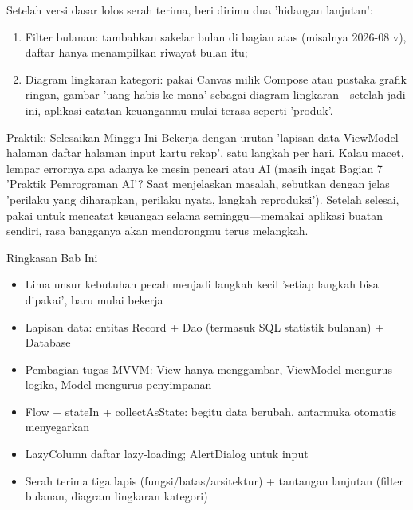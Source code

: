 Setelah versi dasar lolos serah terima, beri dirimu dua 'hidangan lanjutan':

\begin{enumerate}
  \item Filter bulanan: tambahkan sakelar bulan di bagian atas (misalnya 2026-08 v), daftar hanya menampilkan riwayat bulan itu;
  \item Diagram lingkaran kategori: pakai Canvas milik Compose atau pustaka grafik ringan, gambar 'uang habis ke mana' sebagai diagram lingkaran—setelah jadi ini, aplikasi catatan keuanganmu mulai terasa seperti 'produk'.
\end{enumerate}

\begin{tcbpractice}{Praktik: Selesaikan Minggu Ini}
Bekerja dengan urutan 'lapisan data ViewModel halaman daftar halaman input kartu rekap', satu langkah per hari. Kalau macet, lempar errornya apa adanya ke mesin pencari atau AI (masih ingat Bagian 7 'Praktik Pemrograman AI'? Saat menjelaskan masalah, sebutkan dengan jelas 'perilaku yang diharapkan, perilaku nyata, langkah reproduksi'). Setelah selesai, pakai untuk mencatat keuangan selama seminggu—memakai aplikasi buatan sendiri, rasa bangganya akan mendorongmu terus melangkah.

\end{tcbpractice}

\begin{tcbsummary}{Ringkasan Bab Ini}
\begin{itemize}
  \item Lima unsur kebutuhan pecah menjadi langkah kecil 'setiap langkah bisa dipakai', baru mulai bekerja
  \item Lapisan data: entitas Record + Dao (termasuk SQL statistik bulanan) + Database
  \item Pembagian tugas MVVM: View hanya menggambar, ViewModel mengurus logika, Model mengurus penyimpanan
  \item Flow + stateIn + collectAsState: begitu data berubah, antarmuka otomatis menyegarkan
  \item LazyColumn daftar lazy-loading; AlertDialog untuk input
  \item Serah terima tiga lapis (fungsi/batas/arsitektur) + tantangan lanjutan (filter bulanan, diagram lingkaran kategori)
\end{itemize}

\end{tcbsummary}
